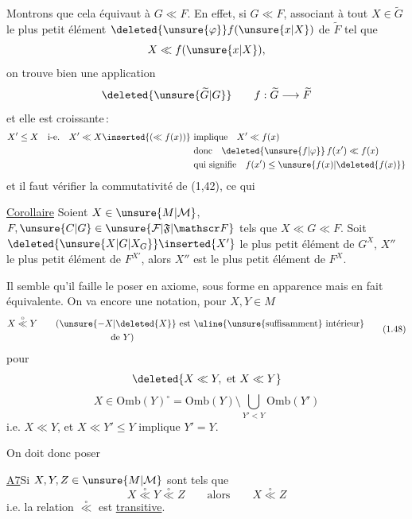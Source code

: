 Montrons que cela équivaut à $G\ll F$. En effet, si $G\ll F$, associant à tout $X\in\widetilde G$ le plus petit élément $\deleted{\unsure{\varphi}}f(\unsure{x|X})$ de $\widetilde F$ tel que
\[
 X\ll f(\unsure{x|X}),
\]
on trouve bien une application
\[
 \deleted{\unsure{\widetilde G|G}}\qquad f:\widetilde G\longrightarrow\widetilde F
\]
et elle est  croissante\,: 
\[
\begin{aligned}
 X'\leq X\quad\text{i-e.}\quad X'\ll X\inserted{(\ll f(x))}\ &\text{implique}\quad X'\ll f(x)\\
 &\text{donc}\quad\deleted{\unsure{f|\varphi}}\,f(x')\ll f(x)\\
 &\text{qui signifie}\quad f(x')\leq\unsure{f(x)|\deleted{f(x)}}
\end{aligned}
\]
et il faut vérifier la commutativité de (1,42), ce qui  

\uline{Corollaire} Soient $X\in\unsure{M|\mathcal M}$, $F,\unsure{C|G}\in\unsure{\mathcal F|\mathfrak F|\mathscr F}$ tels que $X\ll G\ll F$.
Soit $\deleted{\unsure{X|G|X_G}}\inserted{X'}$ le plus petit élément de $G^X$, $X''$ le plus petit élément de $F^{X'}$, alors $X''$ est  le plus petit élément de $F^X$.

Il semble qu'il faille le poser en axiome, sous forme en apparence \unsure{;|,} mais en fait équivalente. On va   encore une notation, pour $X,Y\in M$
\[
\begin{aligned}
 X\overset{\circ}{\ll}Y\qquad &(\unsure{-X|\deleted{X}}\text{ est \uline{\unsure{suffisamment} intérieur}}\\
 &\hspace{6em}\text{de }Y)
\end{aligned}
\tag*{(1.48)}
\]
pour
\[
 \deleted{X\ll Y,\ \text{et}\ X\ll Y}
\]
\[
 X\in\mathrm{Omb}(Y)^{\circ}=\mathrm{Omb}(Y)\setminus\bigcup_{Y'<Y}\mathrm{Omb}(Y')
\]
i.e. $X\ll Y$, et $X\ll Y'\leq Y$ implique $Y'=Y$.

On doit donc poser

\uline{A7}\quad Si $X,Y,Z\in\unsure{M|\mathcal{M}}$ sont tels que
\[
 X\overset{\circ}{\ll}Y\overset{\circ}{\ll}Z\qquad\text{alors}\qquad X\overset{\circ}{\ll}Z
\]
i.e. la relation $\overset{\circ}{\ll}$ est \uline{transitive}.

